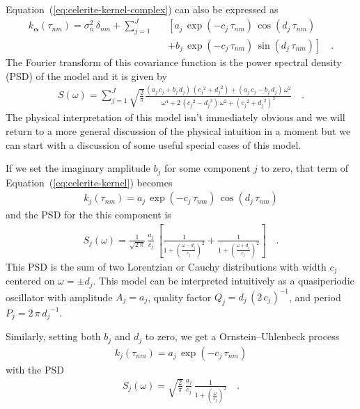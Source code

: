 \documentclass[manuscript, letterpaper]{aastex6}
\renewcommand{\eqref}[1]{\ref{eq:#1}}
\newcommand{\Eq}[1]{Equation~(\eqref{#1})}
\newcommand{\eq}[1]{\Eq{#1}}
\newcommand{\eqlabel}[1]{\label{eq:#1}}
\newcommand{\bvec}[1]{{\ensuremath{\boldsymbol{#1}}}}
\begin{document}
\eq{celerite-kernel-complex} can also be expressed as
\begin{eqnarray}\eqlabel{celerite-kernel}
k_\bvec{\alpha}(\tau_{nm}) = \sigma_n^2\,\delta_{nm} +
    \sum_{j=1}^J &&\left[
    a_j\,\exp\left(-c_j\,\tau_{nm}\right)\,\cos\left(d_j\,\tau_{nm}\right)
        \right.\nonumber\\
    &&+ \left.
    b_j\,\exp\left(-c_j\,\tau_{nm}\right)\,\sin\left(d_j\,\tau_{nm}\right)
\right] \quad.
\end{eqnarray}
The Fourier transform of this covariance function is the power spectral
density (PSD) of the model and it is given by
\begin{eqnarray}\eqlabel{celerite-psd}
S(\omega) = \sum_{j=1}^J \sqrt{\frac{2}{\pi}}
\frac{(a_j\,c_j+b_j\,d_j)\,({c_j}^2+{d_j}^2)+(a_j\,c_j-b_j\,d_j)\,\omega^2}
{\omega^4+2\,({c_j}^2-{d_j}^2)\,\omega^2+({c_j}^2+{d_j}^2)^2}\quad.
\end{eqnarray}
The physical interpretation of this model isn't immediately obvious and we
will return to a more general discussion of the physical intuition in a moment
but we can start with a discussion of some useful special cases of this model.

If we set the imaginary amplitude $b_j$ for some component $j$ to zero, that
term of \eq{celerite-kernel} becomes
\begin{eqnarray}
k_j(\tau_{nm}) =
    a_j\,\exp\left(-c_j\,\tau_{nm}\right)\,\cos\left(d_j\,\tau_{nm}\right)
\end{eqnarray}
and the PSD for the this component is
\begin{eqnarray}\eqlabel{lorentz-psd}
S_j(\omega) = \frac{1}{\sqrt{2\,\pi}}\,\frac{a_j}{c_j}\,\left[
    \frac{1}{1+\left(\frac{\omega-d_j}{c_j}\right)^2} +
    \frac{1}{1+\left(\frac{\omega+d_j}{c_j}\right)^2}
\right] \quad.
\end{eqnarray}
This PSD is the sum of two Lorentzian or Cauchy distributions with width
$c_j$ centered on $\omega = \pm d_j$.
This model can be interpreted intuitively as a quasiperiodic oscillator with
amplitude $A_j = a_j$, quality factor $Q_j = d_j\,(2\,c_j)^{-1}$, and period
$P_j = 2\,\pi\,{d_j}^{-1}$.

Similarly, setting both $b_j$ and $d_j$ to zero, we get a Ornstein--Uhlenbeck
process
\begin{eqnarray}
k_j(\tau_{nm}) = a_j\,\exp\left(-c_j\,\tau_{nm}\right)
\end{eqnarray}
with the PSD
\begin{eqnarray}
S_j(\omega) = \sqrt{\frac{2}{\pi}}\,\frac{a_j}{c_j}\,
    \frac{1}{1+\left(\frac{\omega}{c_j}\right)^2} \quad.
\end{eqnarray}
\end{document}
